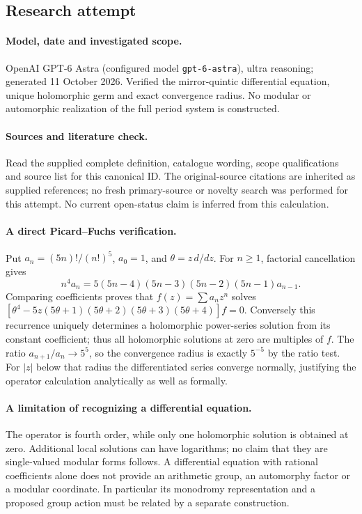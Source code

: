 \documentclass[11pt]{article}
\begin{document}
\subsection{Research attempt}
\paragraph{Model, date and investigated scope.}
OpenAI GPT-6 Astra (configured model \texttt{gpt-6-astra}), ultra reasoning; generated 11 October 2026. Verified the mirror-quintic differential equation, unique holomorphic germ and exact convergence radius. No modular or automorphic realization of the full period system is constructed.

\paragraph{Sources and literature check.}
Read the supplied complete definition, catalogue wording, scope qualifications and source list for this canonical ID. The original-source citations are inherited as supplied references; no fresh primary-source or novelty search was performed for this attempt. No current open-status claim is inferred from this calculation.

\paragraph{A direct Picard--Fuchs verification.}Put \(a_n=(5n)!/(n!)^5\), \(a_0=1\), and \(\theta=z\,d/dz\). For \(n\ge1\), factorial cancellation gives
\[n^4a_n=5(5n-4)(5n-3)(5n-2)(5n-1)a_{n-1}.
\]
Comparing coefficients proves that \(f(z)=\sum a_nz^n\) solves \([\theta^4-5z(5\theta+1)(5\theta+2)(5\theta+3)(5\theta+4)]f=0\). Conversely this recurrence uniquely determines a holomorphic power-series solution from its constant coefficient; thus all holomorphic solutions at zero are multiples of \(f\).
The ratio \(a_{n+1}/a_n\to5^5\), so the convergence radius is exactly \(5^{-5}\) by the ratio test. For \(|z|\) below that radius the differentiated series converge normally, justifying the operator calculation analytically as well as formally.
\paragraph{A limitation of recognizing a differential equation.}The operator is fourth order, while only one holomorphic solution is obtained at zero. Additional local solutions can have logarithms; no claim that they are single-valued modular forms follows. A differential equation with rational coefficients alone does not provide an arithmetic group, an automorphy factor or a modular coordinate. In particular its monodromy representation and a proposed group action must be related by a separate construction.
\end{document}
